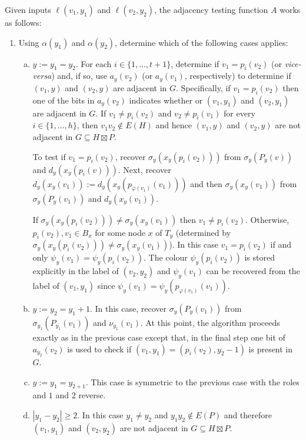 \documentclass{article}
\begin{document}
Given inputs $\ell(v_1,y_1)$ and $\ell(v_2,y_2)$, the adjacency testing function $A$ works as follows:
\begin{enumerate}
    \item Using $\alpha(y_1)$ and $\alpha(y_2)$, determine which of the following cases applies:
    \begin{enumerate}[(a)]
        \item $y:=y_1=y_2$.  For each $i\in\{1,\ldots,t+1\}$, determine if $v_1=p_i(v_2)$ (or \textit{vice-versa}) and, if so, use $a_y(v_2)$ (or $a_y(v_1)$, respectively) to determine if $(v_1,y)$ and $(v_2,y)$ are adjacent in $G$. Specifically, if $v_1=p_i(v_2)$ then one of the bits in $a_y(v_2)$ indicates whether or $(v_1,y_1)$ and $(v_2,y_1)$ are adjacent in $G$. If $v_1\neq p_i(v_2)$ and $v_2\neq p_i(v_1)$ for every $i\in\{1,\ldots,h\}$, then $v_1v_2\not\in E(H)$ and hence $(v_1,y)$ and $(v_2,y)$ are not adjacent in $G\subseteq H\boxtimes P$.

        To test if $v_1=p_i(v_2)$, recover $\sigma_y(x_y(p_i(v_2)))$ from $\sigma_y(P_y(v))$ and $d_y(x_y(p_i(v)))$.  Next, recover $d_y(x_y(v_1)):=d_y(x_y(p_{\varphi(v_1)}(v_1)))$ and then  $\sigma_y(x_y(v_1))$ from $\sigma_y(P_y(v_1))$ and $d_y(x_y(v_1))$.

        If $\sigma_y(x_y(p_i(v_2))) \neq \sigma_y(x_y(v_1))$ then $v_1\neq p_i(v_2)$.  Otherwise, $p_i(v_2), v_1 \in B_x$ for some node $x$ of $T_y$ (determined by $\sigma_y(x_y(p_i(v_2))) \neq \sigma_y(x_y(v_1))$).  In this case $v_1=p_i(v_2)$ if and only $\psi_y(v_1)=\psi_y(p_i(v_2))$.  The colour $\psi_y(p_i(v_2))$ is stored explicitly in the label of $(v_2,y_2)$ and $\psi_y(v_1)$ can be recovered from the label of $(v_1,y_1)$ since $\psi_y(v_1)=\psi_y(p_{\varphi(v_1)}(v_1))$.

        \item $y:=y_2=y_1+1$.  In this case, recover $\sigma_y(P_y(v_1))$ from $\sigma_{y_1}(P_{y_1}(v_1))$ and $\nu_{y_1}(v_1)$.  At this point, the algorithm proceeds exactly as in the previous case except that, in the final step one bit of $a_{y_2}(v_2)$ is used to check if $(v_1,y_1)=(p_i(v_2),y_2-1)$ is present in $G$.

        \item $y:=y_1=y_{2+1}$. This case is symmetric to the previous case with the roles and $1$ and $2$ reverse.

        \item $|y_1-y_2|\ge 2$.  In this case $y_1\neq y_2$ and $y_1y_2\not\in E(P)$ and therefore $(v_1,y_1)$ and $(v_2,y_2)$ are not adjacent in $G\subseteq H\boxtimes P$.
    \end{enumerate}
\end{enumerate}
\end{document}
